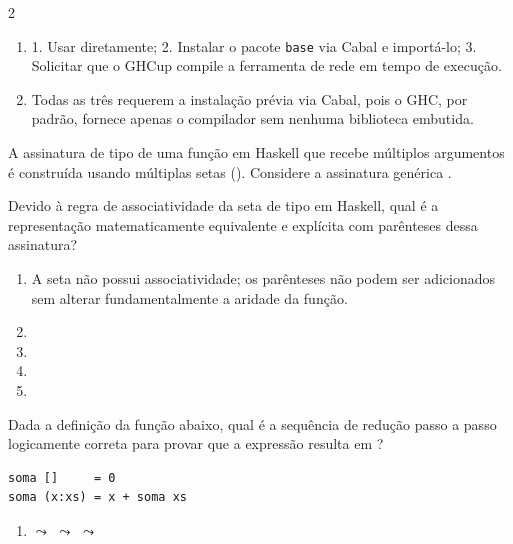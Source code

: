 \documentclass[a4paper,10pt,brazil]{article}
\begin{document}
\begin{multicols}{2}
\begin{enumerate}
  \item 1. Usar diretamente; 2. Instalar o pacote \texttt{base} via Cabal e importá-lo; 3. Solicitar que o GHCup compile a ferramenta de rede em tempo de execução.

  \item Todas as três requerem a instalação prévia via Cabal, pois o GHC, por padrão, fornece apenas o compilador sem nenhuma biblioteca embutida.


\end{enumerate}

A assinatura de tipo de uma função em Haskell que recebe múltiplos argumentos é construída usando múltiplas setas (\haskellinline{->}). Considere a assinatura genérica . 

Devido à regra de associatividade da seta de tipo em Haskell, qual é a representação matematicamente equivalente e explícita com parênteses dessa assinatura?

\begin{enumerate}
  \item A seta não possui associatividade; os parênteses não podem ser adicionados sem alterar fundamentalmente a aridade da função.

  \item {}

  \item {}

  \item {}

  \item {}


\end{enumerate}

Dada a definição da função  abaixo, qual é a sequência de redução passo a passo logicamente correta para provar que a expressão  resulta em ?

\begin{verbatim}
soma []     = 0
soma (x:xs) = x + soma xs
\end{verbatim}

\begin{enumerate}
  \item {} $\leadsto$  $\leadsto$  $\leadsto$ 


\end{enumerate}
\end{multicols}
\end{document}
